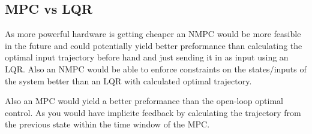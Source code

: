 \subsection{MPC vs LQR}
As more powerful hardware is getting cheaper an NMPC would be more feasible in the future and could potentially yield better preformance than calculating the optimal input trajectory before hand and just sending it in as input using an LQR. Also an NMPC would be able to enforce constraints on the states/inputs of the system better than an LQR with calculated optimal trajectory.

Also an MPC  would yield a better preformance than the open-loop optimal control. As you would have implicite feedback by calculating the trajectory from the previous state within the time window of the MPC.
